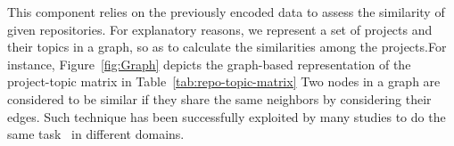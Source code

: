 This component relies on the previously encoded data to assess the similarity 
of given repositories. For explanatory reasons, we represent a set of projects 
and their topics in a graph, so as to calculate the similarities among the 
projects.For instance, Figure~\ref{fig:Graph} depicts the graph-based 
representation of the project-topic matrix in Table~\ref{tab:repo-topic-matrix} 
%
Two nodes in a graph are considered to be similar if they share the same neighbors by considering their edges. Such technique has been successfully exploited by many studies to do the same task~\cite{BRIGUEZ20146467} in different domains.


